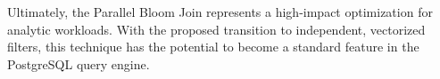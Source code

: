 \documentclass[sigconf,nonacm]{acmart}
\begin{document}
Ultimately, the Parallel Bloom Join represents a high-impact optimization for analytic workloads. With the proposed transition to independent, vectorized filters, this technique has the potential to become a standard feature in the PostgreSQL query engine.




\appendix

\end{document}
